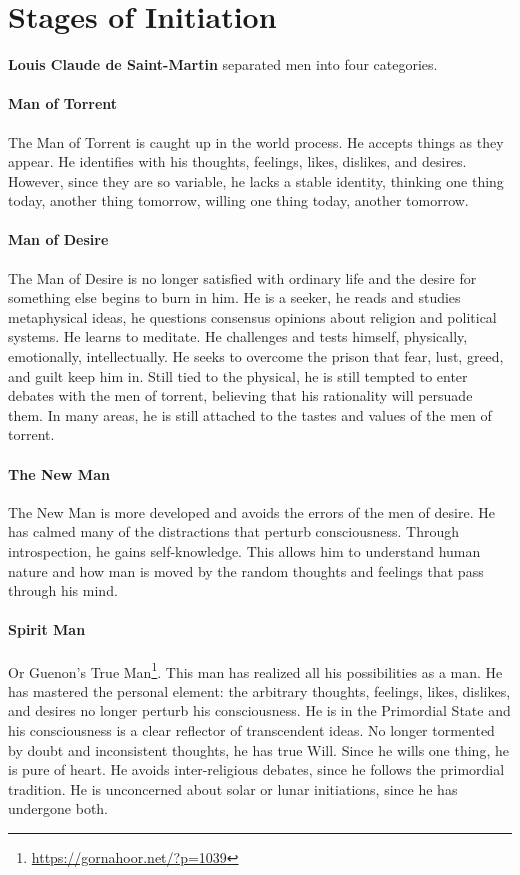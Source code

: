 \section{Stages of Initiation}

\textbf{Louis Claude de Saint-Martin} separated men into four categories.

\paragraph{Man of Torrent}
The Man of Torrent is caught up in the world process. He accepts things as they appear. He identifies with his thoughts, feelings, likes, dislikes, and desires. However, since they are so variable, he lacks a stable identity, thinking one thing today, another thing tomorrow, willing one thing today, another tomorrow.

\paragraph{Man of Desire}
The Man of Desire is no longer satisfied with ordinary life and the desire for something else begins to burn in him. He is a seeker, he reads and studies metaphysical ideas, he questions consensus opinions about religion and political systems. He learns to meditate. He challenges and tests himself, physically, emotionally, intellectually. He seeks to overcome the prison that fear, lust, greed, and guilt keep him in. Still tied to the physical, he is still tempted to enter debates with the men of torrent, believing that his rationality will persuade them. In many areas, he is still attached to the tastes and values of the men of torrent.

\paragraph{The New Man}
The New Man is more developed and avoids the errors of the men of desire. He has calmed many of the distractions that perturb consciousness. Through introspection, he gains self-knowledge. This allows him to understand human nature and how man is moved by the random thoughts and feelings that pass through his mind.

\paragraph{Spirit Man}
Or Guenon's True Man\footnote{\url{https://gornahoor.net/?p=1039}}. This man has realized all his possibilities as a man. He has mastered the personal element: the arbitrary thoughts, feelings, likes, dislikes, and desires no longer perturb his consciousness. He is in the Primordial State and his consciousness is a clear reflector of transcendent ideas. No longer tormented by doubt and inconsistent thoughts, he has true Will. Since he wills one thing, he is pure of heart. He avoids inter-religious debates, since he follows the primordial tradition. He is unconcerned about solar or lunar initiations, since he has undergone both.



